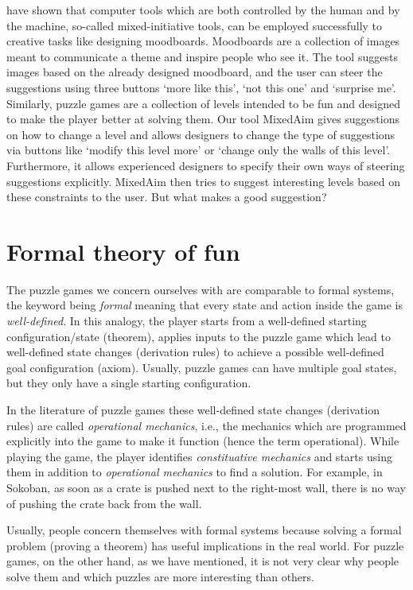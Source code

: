 \cite{Koch} have shown that computer tools which are both controlled by the human and by the machine, so-called mixed-initiative tools, can be employed successfully to creative tasks like designing moodboards. Moodboards are a collection of images meant to communicate a theme and inspire people who see it. The tool suggests images based on the already designed moodboard, and the user can steer the suggestions using three buttons `more like this', `not this one' and `surprise me'. Similarly, puzzle games are a collection of levels intended to be fun and designed to make the player better at solving them. Our tool MixedAim gives suggestions on how to change a level and allows designers to change the type of suggestions via buttons like `modify this level more' or `change only the walls of this level'. Furthermore, it allows experienced designers to specify their own ways of steering suggestions explicitly.
MixedAim then tries to suggest interesting levels based on these constraints to the user. But what makes a good suggestion? 


\section{Formal theory of fun}
The puzzle games we concern ourselves with are comparable to formal systems, the keyword being \textit{formal} meaning that every state and action inside the game is \textit{well-defined}.
In this analogy, the player starts from a well-defined starting configuration/state (theorem), applies inputs to the puzzle game which lead to well-defined state changes (derivation rules) to achieve a possible well-defined goal configuration (axiom). Usually, puzzle games can have multiple goal states, but they only have a single starting configuration.

In the literature of puzzle games \cite{RulesOfPlay} these well-defined state changes (derivation rules) are called  \textit{operational mechanics}, i.e., the mechanics which are programmed explicitly into the game to make it function (hence the term operational). While playing the game, the player identifies \textit{constituative mechanics} and starts using them in addition to \textit{operational mechanics} to find a solution. For example, in Sokoban, as soon as a crate is pushed next to the right-most wall, there is no way of pushing the crate back from the wall. 

Usually, people concern themselves with formal systems because solving a formal problem (proving a theorem) has useful implications in the real world. For puzzle games, on the other hand, as we have mentioned, it is not very clear why people solve them and which puzzles are more interesting than others.

